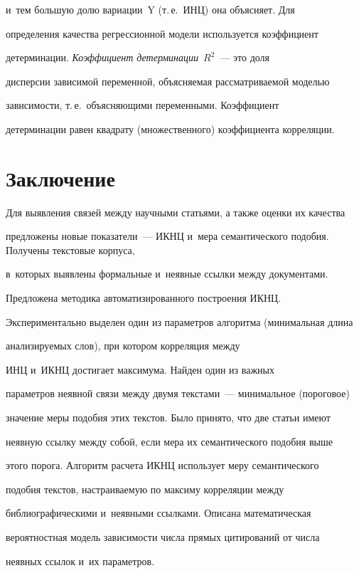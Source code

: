 и~тем большую долю вариации~$\mathrm{Y}$ (т.\,е.\ ИНЦ) она объясняет. Для 


определения качества регрессионной модели используется коэффициент 


детерминации. \textit{Коэффициент детерминации}~$R^2$~--- это доля 


дисперсии зависимой переменной, объясняемая рассматриваемой моделью 


зависимости, т.\,е.\ объясняющими переменными. Коэффициент 


детерминации равен квадрату (множественного) коэффициента корреляции.


  


\section{Заключение}





  Для выявления связей между научными статьями, а также оценки их качества 


предложены новые показатели~--- ИКНЦ и~мера семантического подобия. Получены текстовые корпуса, 


в~которых выявлены формальные и~неявные ссылки между документами. 


Предложена методика автоматизированного построения ИКНЦ. 


Экспериментально выделен один из параметров алгоритма (минимальная длина 


анализируемых слов), при котором корреляция между 


ИНЦ и~ИКНЦ достигает максимума. Найден один из важных 


параметров неявной связи между двумя текстами~--- минимальное (пороговое) 


значение меры подобия этих текстов. Было принято, что две статьи имеют 


неявную ссылку между собой, если мера их семантического подобия выше 


этого порога. Алгоритм расчета ИКНЦ использует меру семантического 


подобия текстов, настраиваемую по максиму корреляции между 


библиографическими и~неявными ссылками. Описана математическая 


вероятностная модель зависимости числа прямых цитирований от числа 


неявных ссылок и~их параметров.



